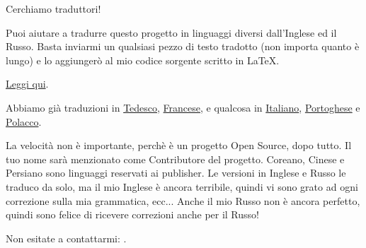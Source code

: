 \vspace*{\fill}

\Huge Cerchiamo traduttori!

\normalsize

\bigskip
\bigskip
\bigskip

Puoi aiutare a tradurre questo progetto in linguaggi diversi dall'Inglese ed il Russo.
Basta inviarmi un qualsiasi pezzo di testo tradotto (non importa quanto è lungo) e lo aggiungerò al mio codice sorgente scritto in LaTeX.

\href{https://github.com/DennisYurichev/RE-for-beginners/blob/master/Translation.md}{Leggi qui}.

Abbiamo già traduzioni in \href{https://beginners.re/RE4B-DE.pdf}{Tedesco},
\href{https://beginners.re/RE4B-FR.pdf}{Francese}, e qualcosa in
\href{https://yurichev.com/tmp/RE4B-IT-partial.pdf}{Italiano},
\href{https://yurichev.com/tmp/RE4B-PTBR-lite2.pdf}{Portoghese} e
\href{https://yurichev.com/tmp/RE4B-PL.pdf}{Polacco}.

La velocità non è importante, perchè è un progetto Open Source, dopo tutto.
Il tuo nome sarà menzionato come Contributore del progetto.
Coreano, Cinese e Persiano sono linguaggi reservati ai publisher.
Le versioni in Inglese e Russo le traduco da solo, ma il mio Inglese è ancora terribile, quindi vi sono grato ad ogni correzione sulla mia grammatica, ecc...
Anche il mio Russo non è ancora perfetto, quindi sono felice di ricevere correzioni anche per il Russo!%

Non esitate a contattarmi: \GTT{\EMAIL}.

\vspace*{\fill}
\vfill
